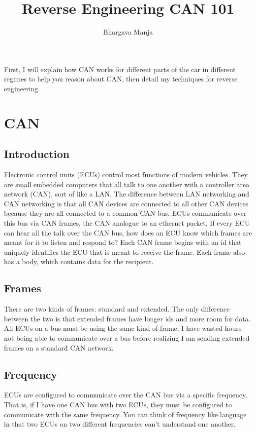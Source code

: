 \documentclass[12pt]{article}
\begin{document}
\title{Reverse Engineering CAN 101}
\author{Bhargava Manja}
\maketitle

First, I will explain how CAN works for different parts of the car in different
regimes to help you reason about CAN, then detail my techniques for reverse
engineering.

\section{CAN}
\subsection{Introduction}
Electronic control units (ECUs) control most functions of modern vehicles. They
are small embedded computers that all talk to one another with a controller
area network (CAN), sort of like a LAN. The difference between LAN networking
and CAN networking is that all CAN devices are connected to all other CAN devices
because they are all connected to a common CAN bus. ECUs communicate over this
bus via CAN frames, the CAN analogue to an ethernet packet. If every ECU can
hear all the talk over the CAN bus, how does an ECU know which frames are meant
for it to listen and respond to? Each CAN frame begins with an id that uniquely
identifies the ECU that is meant to receive the frame. Each frame also has
a body, which contains data for the recipient. 

\subsection{Frames}
There are two kinds of frames: standard and extended. The only difference
between the two is that extended frames have longer ids and more room for data.
All ECUs on a bus must be using the same kind of frame. I have wasted hours not
being able to communicate over a bus before realizing I am sending extended
frames on a standard CAN network.

\subsection{Frequency}
ECUs are configured to communicate over the CAN bus via a specific frequency.
That is, if I have one CAN bus with two ECUs, they must be configured to
communicate with the same frequency. You can think of frequency like language
in that two ECUs on two different frequencies can't understand one another.
\end{document}
